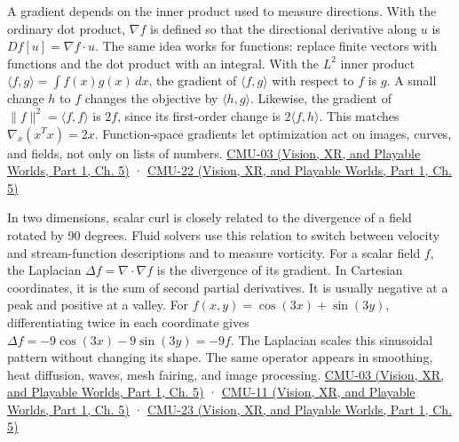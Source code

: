 \hypertarget{03-visual-computing-i-ch001-coordinate-free-products-and-the-meaning-of-second-derivatives}{}

A gradient depends on the inner product used to measure directions. With the ordinary dot product, \(\nabla f\) is defined so that the directional derivative along \(u\) is \(Df[u]=\nabla f\cdot u\). The same idea works for functions: replace finite vectors with functions and the dot product with an integral. With the \(L^2\) inner product \(\langle f,g\rangle=\int f(x)g(x)\,dx\), the gradient of \(\langle f,g\rangle\) with respect to \(f\) is \(g\). A small change \(h\) to \(f\) changes the objective by \(\langle h,g\rangle\). Likewise, the gradient of \(\|f\|^2=\langle f,f\rangle\) is \(2f\), since its first-order change is \(2\langle f,h\rangle\). This matches \(\nabla_x(x^Tx)=2x\). Function-space gradients let optimization act on images, curves, and fields, not only on lists of numbers. \href{../07-Vision-XR-and-Playable-Worlds-P01/main.pdf\#04-visual-computing-ii-ch036-cmu-03---vector-calculus-preview}{CMU-03 (Vision, XR, and Playable Worlds, Part 1, Ch. 5)} · \href{../07-Vision-XR-and-Playable-Worlds-P01/main.pdf\#04-visual-computing-ii-ch036-cmu-22---optimization}{CMU-22 (Vision, XR, and Playable Worlds, Part 1, Ch. 5)}

In two dimensions, scalar curl is closely related to the divergence of a field rotated by 90 degrees. Fluid solvers use this relation to switch between velocity and stream-function descriptions and to measure vorticity. For a scalar field \(f\), the Laplacian \(\Delta f=\nabla\cdot\nabla f\) is the divergence of its gradient. In Cartesian coordinates, it is the sum of second partial derivatives. It is usually negative at a peak and positive at a valley. For \(f(x,y)=\cos(3x)+\sin(3y)\), differentiating twice in each coordinate gives \(\Delta f=-9\cos(3x)-9\sin(3y)=-9f\). The Laplacian scales this sinusoidal pattern without changing its shape. The same operator appears in smoothing, heat diffusion, waves, mesh fairing, and image processing. \href{../07-Vision-XR-and-Playable-Worlds-P01/main.pdf\#04-visual-computing-ii-ch036-cmu-03---vector-calculus-preview}{CMU-03 (Vision, XR, and Playable Worlds, Part 1, Ch. 5)} · \href{../07-Vision-XR-and-Playable-Worlds-P01/main.pdf\#04-visual-computing-ii-ch036-cmu-11---digital-geometry-processing}{CMU-11 (Vision, XR, and Playable Worlds, Part 1, Ch. 5)} · \href{../07-Vision-XR-and-Playable-Worlds-P01/main.pdf\#04-visual-computing-ii-ch036-cmu-23---physically-based-animation-and-pdes}{CMU-23 (Vision, XR, and Playable Worlds, Part 1, Ch. 5)}

